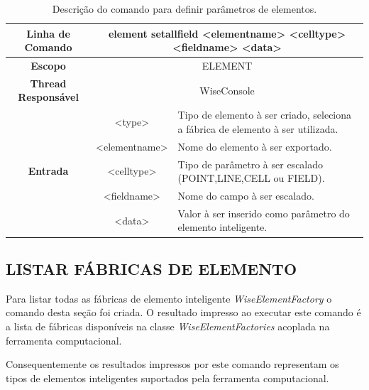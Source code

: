 \documentclass[a4paper,12pt]{monografia}
\theoremstyle{plain}
\theoremstyle{definition}
\theoremstyle{remark}
\begin{document}
\begin{center}
	\begin{table}[!htbp]
		\begin{tabular}{|c|c|m{}|}
			\hline
			\textbf{Linha de Comando} & \multicolumn{2}{c|}{element set\underline{\space\space}all\underline{\space\space}field <element\underline{\space\space}name> <cell\underline{\space\space}type> <field\underline{\space\space}name> <data>} \\
			\hline
			\textbf{Escopo} & \multicolumn{2}{c|}{ELEMENT} \\
			\hline
			\textbf{Thread Responsável} & \multicolumn{2}{c|}{WiseConsole} \\
			\hline
			\multirow{5}{*}{\textbf{Entrada}} & <type> & Tipo de elemento à ser criado, seleciona a fábrica de elemento à ser utilizada. \\
			
			& <element\underline{\space\space}name> & Nome do elemento à ser exportado. \\
			& <cell\underline{\space\space}type> & Tipo de parâmetro à ser escalado (POINT,LINE,CELL ou FIELD). \\
			& <field\underline{\space\space}name> & Nome do campo à ser escalado. \\
			& <data> & Valor à ser inserido como parâmetro do elemento inteligente. \\
			\hline
		\end{tabular}
		\caption{Descrição do comando para definir parâmetros de elementos.}
		\label{tab:set_all_field_element}
	\end{table}
\end{center}

\subsection{LISTAR FÁBRICAS DE ELEMENTO}\label{sec:list_element_factories}

Para listar todas as fábricas de elemento inteligente \textit{WiseElementFactory} o comando desta seção foi criada. O resultado impresso ao executar este comando é a lista de fábricas disponíveis na classe \textit{WiseElementFactories} acoplada na ferramenta computacional.

Consequentemente os resultados impressos por este comando representam os tipos de elementos inteligentes suportados pela ferramenta computacional.
\end{document}
